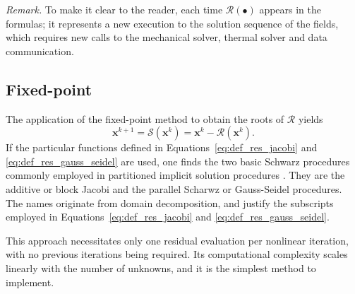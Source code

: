 

     \smallskip
          \noindent \textit{Remark.} To make it clear to the reader, each time $\bm{\mathcal{R}}(\bullet)$ appears in the formulas; it represents a new execution to the solution sequence of the fields, which requires new calls to the mechanical solver, thermal solver and data communication.
          \smallskip

          \subsection{Fixed-point} \label{sec:fixed_point_approach}

          The application of the fixed-point method to obtain the roots of \(\bm{\mathcal{R}}\) yields
          \begin{equation}
            \mathbf{x}^{k+1} = \bm{\mathcal{S}}(\mathbf{x}^k) = \mathbf{x}^k - \bm{\mathcal{R}}(\mathbf{x}^k).
          \end{equation}
          If the particular functions defined in Equations~\eqref{eq:def_res_jacobi} and \eqref{eq:def_res_gauss_seidel} are used, one finds the  two basic Schwarz procedures commonly employed in partitioned implicit solution procedures \citep{uekermann_parallel_2013, danowski_computational_2014, gatzhammer_efficient_2014}.
          They are the additive or block Jacobi and the parallel Scharwz or Gauss-Seidel procedures.
          The names originate from domain decomposition, and justify the subscripts employed in Equations~\eqref{eq:def_res_jacobi} and \eqref{eq:def_res_gauss_seidel}.

          This approach necessitates only one residual evaluation per nonlinear iteration, with no previous iterations being required.
          Its computational complexity scales linearly with the number of unknowns, and it is the simplest method to implement.

